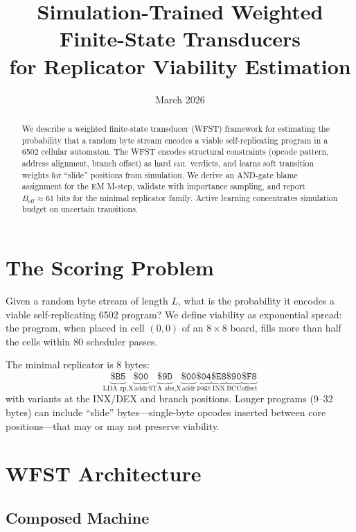 \documentclass{article}
\title{Simulation-Trained Weighted Finite-State Transducers\\
for Replicator Viability Estimation}
\author{}
\date{March 2026}
\newcommand{\hex}[1]{\texttt{\$#1}}
\newcommand{\Beff}{B_{\mathrm{eff}}}
\newcommand{\FAIL}{\textsc{fail}}
\begin{document}
\maketitle

\begin{abstract}
We describe a weighted finite-state transducer (WFST) framework for
estimating the probability that a random byte stream encodes a viable
self-replicating program in a 6502 cellular automaton. The WFST
encodes structural constraints (opcode pattern, address alignment,
branch offset) as hard \FAIL\ verdicts, and learns soft transition
weights for ``slide'' positions from simulation. We derive an
AND-gate blame assignment for the EM M-step, validate with importance
sampling, and report $\Beff \approx 61$ bits for the minimal
replicator family. Active learning concentrates simulation budget
on uncertain transitions.
\end{abstract}

\section{The Scoring Problem}

Given a random byte stream of length $L$, what is the probability it
encodes a viable self-replicating 6502 program? We define viability as
exponential spread: the program, when placed in cell $(0,0)$ of an
$8 \times 8$ board, fills more than half the cells within 80 scheduler
passes.

The minimal replicator is 8 bytes:
\begin{equation}
\underbrace{\hex{B5}}_{\text{LDA zp,X}}
\underbrace{\hex{00}}_{\text{addr}}
\underbrace{\hex{9D}}_{\text{STA abs,X}}
\underbrace{\hex{00}}_{\text{addr}}
\underbrace{\hex{04}}_{\text{page}}
\underbrace{\hex{E8}}_{\text{INX}}
\underbrace{\hex{90}}_{\text{BCC}}
\underbrace{\hex{F8}}_{\text{offset}}
\end{equation}
with variants at the INX/DEX and branch positions. Longer programs
(9--32 bytes) can include ``slide'' bytes---single-byte opcodes
inserted between core positions---that may or may not preserve viability.

\section{WFST Architecture}

\subsection{Composed Machine}
\end{document}
